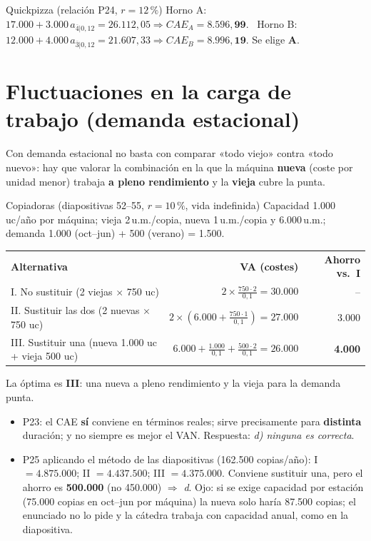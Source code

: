 \documentclass[10pt,a4paper,twoside]{article}
\newcommand{\an}[2]{a_{\overline{#1}|#2}}
\newcommand{\thead}[1]{\leavevmode\sffamily\bfseries\color{white}#1}
\newcommand{\headrow}{\rowcolor{steel}}
\begin{document}
\begin{ejemplo}{Quickpizza (relación P24, $r=12\,\%$)}
Horno A: $17.000+3.000\,\an{4}{0,12}=26.112,05\Rightarrow CAE_A=\mathbf{8.596,99}$. \
Horno B: $12.000+4.000\,\an{3}{0,12}=21.607,33\Rightarrow CAE_B=\mathbf{8.996,19}$. Se elige \textbf{A}.
\end{ejemplo}

\section{Fluctuaciones en la carga de trabajo (demanda estacional)}
Con demanda estacional no basta con comparar «todo viejo» contra «todo nuevo»: hay que valorar la combinación en la que
la máquina \textbf{nueva} (coste por unidad menor) trabaja \textbf{a pleno rendimiento} y la \textbf{vieja} cubre la punta.

\begin{ejemplo}{Copiadoras (diapositivas 52–55, $r=10\,\%$, vida indefinida)}
Capacidad 1.000 uc/año por máquina; vieja 2\,u.m./copia, nueva 1\,u.m./copia y 6.000\,u.m.; demanda 1.000 (oct–jun) + 500 (verano) = 1.500.
\begin{center}\small
\begin{tabular}{@{}l r r@{}}
\headrow \thead{Alternativa} & \thead{VA (costes)} & \thead{Ahorro vs.~I}\\
I. No sustituir (2 viejas $\times$ 750 uc) & $2\times\frac{750\cdot2}{0,1}=30.000$ & --\\
\rowcolor{mist}II. Sustituir las dos (2 nuevas $\times$ 750 uc) & $2\times\left(6.000+\frac{750\cdot1}{0,1}\right)=27.000$ & 3.000\\
III. Sustituir una (nueva 1.000 uc + vieja 500 uc) & $6.000+\frac{1.000}{0,1}+\frac{500\cdot2}{0,1}=26.000$ & \textbf{4.000}\\
\end{tabular}
\end{center}
La óptima es \textbf{III}: una nueva a pleno rendimiento y la vieja para la demanda punta.
\end{ejemplo}

\begin{trampa}[Relación P23 y P25]
\begin{itemize}
  \item P23: el CAE \textbf{sí} conviene en términos reales; sirve precisamente para \textbf{distinta} duración; y no siempre
        es mejor el VAN. Respuesta: \emph{d) ninguna es correcta}.
  \item P25 aplicando el método de las diapositivas (162.500 copias/año): I $=4.875.000$; II $=4.437.500$; III $=4.375.000$.
        Conviene sustituir una, pero el ahorro es \textbf{500.000} (no 450.000) $\Rightarrow$ \emph{d}. Ojo: si se exige
        capacidad por estación (75.000 copias en oct–jun por máquina) la nueva solo haría 87.500 copias; el enunciado no
        lo pide y la cátedra trabaja con capacidad anual, como en la diapositiva.
\end{itemize}
\end{trampa}
\end{document}
